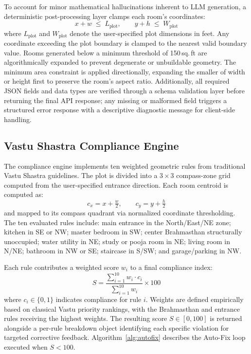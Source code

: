 \documentclass[10pt, twocolumn, letterpaper]{article}
\begin{document}
To account for minor mathematical hallucinations inherent to LLM generation,
a deterministic post-processing layer clamps each room's coordinates:
\begin{equation}
  x + w \;\leq\; L_{\text{plot}}, \qquad y + h \;\leq\; W_{\text{plot}}
\end{equation}
where $L_{\text{plot}}$ and $W_{\text{plot}}$ denote the user-specified plot
dimensions in feet. Any coordinate exceeding the plot boundary is clamped to
the nearest valid boundary value. Rooms generated below a minimum threshold
of 150\,sq.\,ft are algorithmically expanded to prevent degenerate or
unbuildable geometry. The minimum area constraint is applied directionally,
expanding the smaller of width or height first to preserve the room's aspect
ratio. Additionally, all required JSON fields and data types are verified
through a schema validation layer before returning the final API response;
any missing or malformed field triggers a structured error response with
a descriptive diagnostic message for client-side handling.

\subsection{Vastu Shastra Compliance Engine}

The compliance engine implements ten weighted geometric rules from traditional
Vastu Shastra guidelines. The plot is divided into a $3{\times}3$ compass-zone
grid computed from the user-specified entrance direction. Each room centroid is
computed as:
\begin{equation}
  c_x = x + \tfrac{w}{2}, \qquad c_y = y + \tfrac{h}{2}
\end{equation}
and mapped to its compass quadrant via normalized coordinate thresholding.
The ten evaluated rules include: main entrance in the North/East/NE zone;
kitchen in SE or NW; master bedroom in SW; center Brahmasthan structurally
unoccupied; water utility in NE; study or pooja room in NE; living room
in N/NE; bathroom in NW or SE; staircase in S/SW; and garage/parking in NW.

Each rule contributes a weighted score $w_i$ to a final compliance index:
\begin{equation}
  S = \frac{\sum_{i=1}^{10} w_i \cdot c_i}{\sum_{i=1}^{10} w_i} \times 100
\end{equation}
where $c_i \in \{0, 1\}$ indicates compliance for rule $i$. Weights are
defined empirically based on classical Vastu priority rankings, with the
Brahmasthan and entrance rules receiving the highest weights. The resulting
score $S \in [0, 100]$ is returned alongside a per-rule breakdown object
identifying each specific violation for targeted corrective feedback.
Algorithm~\ref{alg:autofix} describes the Auto-Fix loop executed when $S < 100$.
\end{document}
